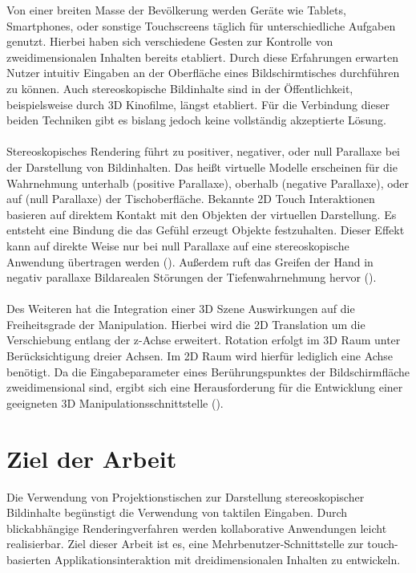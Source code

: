 Von einer breiten Masse der Bevölkerung werden Geräte wie Tablets, Smartphones, oder sonstige Touchscreens täglich für unterschiedliche Aufgaben genutzt. Hierbei haben sich verschiedene Gesten zur Kontrolle von zweidimensionalen Inhalten bereits etabliert. Durch diese Erfahrungen erwarten Nutzer intuitiv Eingaben an der Oberfläche eines Bildschirmtisches durchführen zu können.  Auch stereoskopische Bildinhalte sind in der Öffentlichkeit, beispielsweise durch 3D Kinofilme, längst etabliert. Für die Verbindung dieser beiden Techniken gibt es bislang jedoch keine vollständig akzeptierte Lösung.
\\\\ 
Stereoskopisches Rendering führt zu positiver, negativer, oder null Parallaxe bei der Darstellung von Bildinhalten. Das heißt virtuelle Modelle erscheinen für die Wahrnehmung unterhalb (positive Parallaxe), oberhalb (negative Parallaxe), oder auf (null Parallaxe) der Tischoberfläche. Bekannte 2D Touch Interaktionen basieren auf direktem Kontakt mit den Objekten der virtuellen Darstellung. Es entsteht eine Bindung die das Gefühl erzeugt Objekte festzuhalten. Dieser Effekt kann auf direkte Weise nur bei null Parallaxe auf eine stereoskopische Anwendung übertragen werden (\cite{bruder:2013}). Außerdem ruft das Greifen der Hand in negativ parallaxe Bildarealen Störungen der Tiefenwahrnehmung hervor (\cite{delariviere:2010}).
\\\\
Des Weiteren hat die Integration einer 3D Szene Auswirkungen auf die Freiheitsgrade der Manipulation. Hierbei wird die 2D Translation um die Verschiebung entlang der z-Achse erweitert. Rotation erfolgt im 3D Raum unter Berücksichtigung dreier Achsen. Im 2D Raum wird hierfür lediglich eine Achse benötigt. Da die Eingabeparameter eines Berührungspunktes der Bildschirmfläche zweidimensional sind, ergibt sich eine Herausforderung für die Entwicklung einer geeigneten 3D Manipulationsschnittstelle (\cite{martinet2012}).


\section{Ziel der Arbeit}
\label{sec:ziel_der_arbeit}

Die Verwendung von Projektionstischen zur Darstellung stereoskopischer Bildinhalte begünstigt die Verwendung von taktilen Eingaben. Durch blickabhängige Renderingverfahren werden kollaborative Anwendungen leicht realisierbar. Ziel dieser Arbeit ist es, eine Mehrbenutzer-Schnittstelle zur touch-basierten Applikationsinteraktion mit dreidimensionalen Inhalten zu entwickeln. 